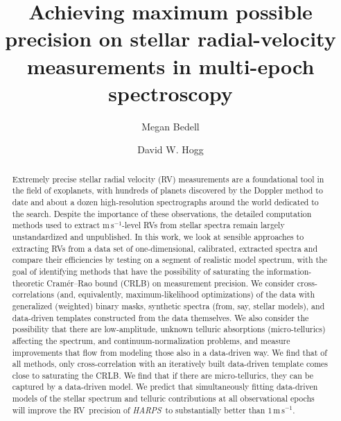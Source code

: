 \documentclass[modern]{aastex61}
\newcommand{\unit}[1]{\mathrm{#1}}
\newcommand{\m}{\unit{m}}
\newcommand{\s}{\unit{s}}
\newcommand{\ms}{\m\,\s^{-1}}
\newcommand{\acronym}[1]{{\small{#1}}}
\newcommand{\project}[1]{\textsl{#1}}
\newcommand{\HARPS}{\project{\acronym{HARPS}}}
\newcommand{\RV}{\acronym{RV}}
\newcommand{\CRLB}{\acronym{CRLB}}
\begin{document}
\graphicspath{ {figures/} }

\title{Achieving maximum possible precision on stellar radial-velocity measurements in multi-epoch spectroscopy}

\author{Megan Bedell}

\author[0000-0003-2866-9403]{David W. Hogg}

\begin{abstract}
Extremely precise stellar radial velocity (\RV) measurements are a foundational tool in the field of exoplanets, with hundreds of planets discovered by the Doppler method to date and about a dozen high-resolution spectrographs around the world dedicated to the search.
Despite the importance of these observations, the detailed computation methods used to extract $\ms$-level \RV s from stellar spectra remain largely unstandardized and unpublished.
In this work, we look at sensible approaches to extracting \RV s from a data set of  one-dimensional, calibrated, extracted spectra and compare their efficiencies by testing on a segment of realistic model spectrum, with the goal of identifying methods that have the possibility of saturating the information-theoretic Cram\'er--Rao bound (\CRLB) on measurement precision.
We consider cross-correlations (and, equivalently, maximum-likelihood optimizations) of the data with generalized (weighted) binary masks, synthetic spectra (from, say, stellar models), and data-driven templates constructed from the data themselves.
We also consider the possibility that there are low-amplitude, unknown telluric absorptions (micro-tellurics) affecting the spectrum, and continuum-normalization problems, and measure improvements that flow from modeling those also in a data-driven way.
We find that of all methods, only cross-correlation with an iteratively built data-driven template comes close to saturating the \CRLB.
We find that if there are micro-tellurics, they can be captured by a data-driven model.
We predict that simultaneously fitting data-driven models of the stellar spectrum and telluric contributions at all observational epochs will improve the \RV\ precision of \HARPS\ to substantially better than $1\,\ms$.
\end{abstract}
\end{document}
